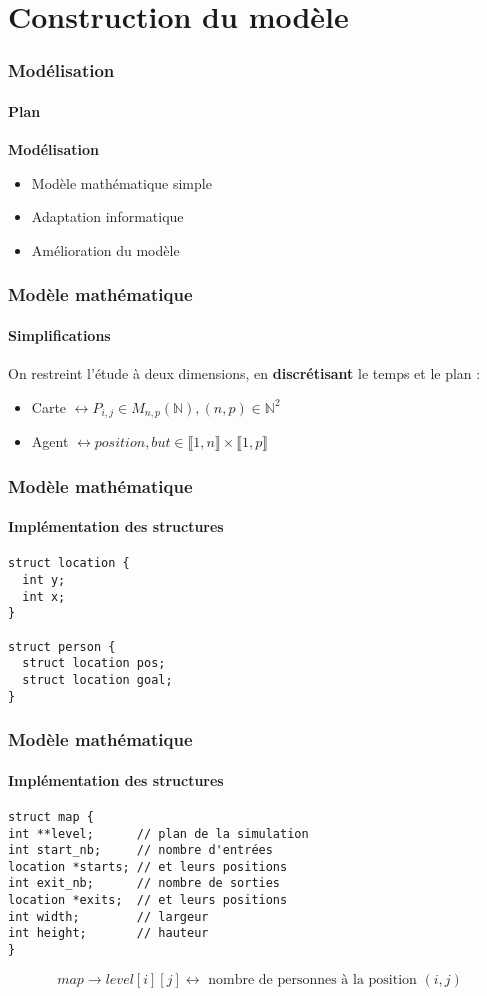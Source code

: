 \section{Construction du modèle}

\begin{frame}
    \frametitle{Modélisation}
    \framesubtitle{Plan}
    \textbf{Modélisation}
    \begin{itemize}
        \item <2-> Modèle mathématique simple
        \item <3-> Adaptation informatique
        \item <4-> Amélioration du modèle
    \end{itemize}
\end{frame}


\begin{frame}
    \frametitle{Modèle mathématique}
    \framesubtitle{Simplifications}
    On restreint l’étude à deux dimensions, en \textbf{discrétisant} le temps et le plan :
    \bigskip
    \begin{itemize}
        \item <2-> Carte $\leftrightarrow P_{i,j} \in M_{n,p}(\mathbb{N}), (n, p) \in \mathbb{N}^2$
        \item <3->  Agent $ \leftrightarrow position, but \in \llbracket 1, n\rrbracket \times \llbracket 1, p\rrbracket $
    \end{itemize}

\end{frame}



\begin{frame}[fragile]
    \frametitle{Modèle mathématique}
    \framesubtitle{Implémentation des structures}
    \begin{code}
        \begin{verbatim}
struct location {
  int y;
  int x;
}

struct person {
  struct location pos;
  struct location goal;
}
\end{verbatim}
    \end{code}
\end{frame}


\begin{frame}[fragile]
    \frametitle{Modèle mathématique}
    \framesubtitle{Implémentation des structures}
    \begin{code}
        \begin{verbatim}
struct map {
int **level;      // plan de la simulation
int start_nb;     // nombre d'entrées
location *starts; // et leurs positions
int exit_nb;      // nombre de sorties
location *exits;  // et leurs positions
int width;        // largeur
int height;       // hauteur
}
\end{verbatim}
    \end{code}
    \[ map \rightarrow level[i][j] \leftrightarrow \text{ nombre de personnes à la position } (i,j)\]
\end{frame}


